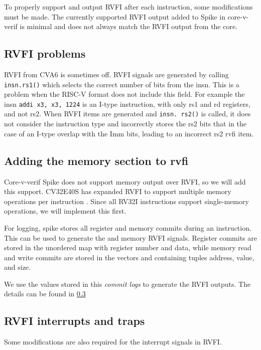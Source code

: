 To properly support  and output RVFI after each instruction, some modifications must be made. The currently supported RVFI output added to Spike in core-v-verif is minimal and does not always match the RVFI output from the core.



\subsection{RVFI problems}
RVFI from CVA6 is sometimes off. RVFI signals are generated by calling \lstinline{insn.rs1()} which selects the correct number of bits from the insn. This is a problem when the RISC-V format does not include this field. For example the insn \lstinline{addi x3, x3, 1224} is an I-type instruction, with only rs1 and rd registers, and not rs2. When RVFI items are generated and \lstinline{insn. rs2()} is called, it does not consider the instruction type and incorrectly stores the rs2 bits that in the case of an I-type overlap with the Imm bits, leading to an incorrect rs2 rvfi item.


\subsection{Adding the memory section to rvfi}

Core-v-verif Spike does not support memory output over RVFI, so we will add this support. 
CV32E40S has expanded RVFI to support multiple memory operations per instruction \cite{openhwgroupRISCVFormalInterface2023}. Since all RV32I instructions support single-memory operations, we will implement this first.

For logging, spike stores all register and memory commits during an instruction. This can be used to generate the  and memory RVFI signals. Register commits are stored in the unordered map  with register number and data, while memory read and write commits are stored in the vectors  and  containing tuples address, value, and size.

We use the values stored in this \textit{commit logs} to generate the RVFI outputs. The details can be found in \ref{}

\subsection{RVFI interrupts and traps}

Some modifications are also required for the interrupt signals in RVFI.

